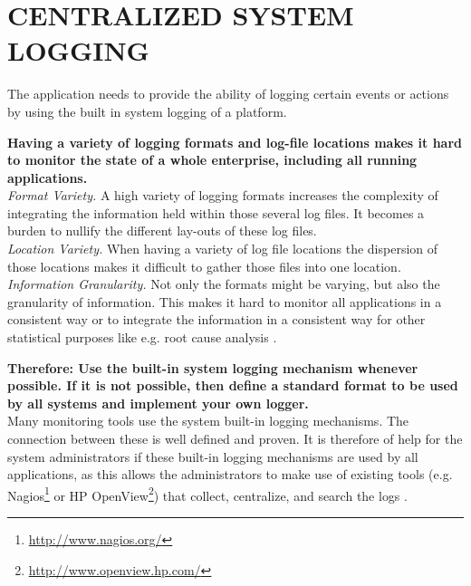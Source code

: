 \newpage
\section*{CENTRALIZED SYSTEM LOGGING}

The application needs to provide the ability of logging certain events or actions by using the built in system logging of a platform. 

\begin{center}
  
\end{center}

\textbf{Having a variety of logging formats and log-file locations makes it hard to monitor the state of a whole enterprise, including all running applications.}\\

\textit{Format Variety.} A high variety of logging formats increases the complexity of integrating the information held within those several log files. It becomes a burden to nullify the different lay-outs of these log files.\\ 

\textit{Location Variety.} When having a variety of log file locations the dispersion of those locations makes it difficult to gather those files into one location.\\

\textit{Information Granularity.} Not only the formats might be varying, but also the granularity of information. This makes it hard to monitor all applications in a consistent way or to integrate the information in a consistent way for other statistical purposes like e.g. root cause analysis \cite{conf/mkwi/PaschkeS06}.

\begin{center}
   
\end{center}

\textbf{Therefore: Use the built-in system logging mechanism whenever possible. If it is not possible, then define a standard format to be used by all systems and implement your own logger.}\\

Many monitoring tools use the system built-in logging mechanisms. The connection between these is well defined and proven. It is therefore of help for the system administrators if these built-in logging mechanisms are used by all applications, as this allows the administrators to make use of existing tools (e.g. Nagios\footnote{\url{http://www.nagios.org/}} or HP OpenView\footnote{\url{http://www.openview.hp.com/}}) that collect, centralize, and search the logs \cite{Limoncelli2011a}.

